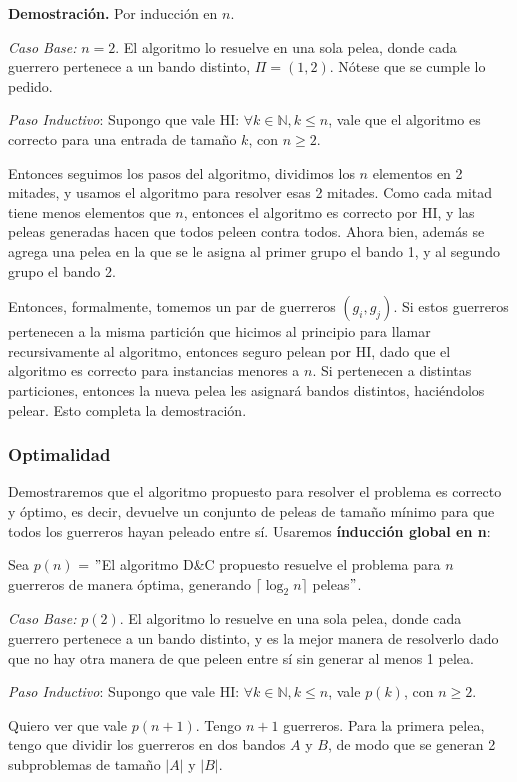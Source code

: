 \textbf{Demostración.}  Por inducción en $n$.

\textit{Caso Base:} $n = 2$. El algoritmo lo resuelve en una sola pelea, donde cada guerrero pertenece a un bando distinto, $\Pi = {(1,2)}$. Nótese que se cumple lo pedido.

\textit{Paso Inductivo}: Supongo que vale HI: $\forall k \in \mathbb{N}, k \leq n$, vale que el algoritmo es correcto para una entrada de tamaño $k$, con $n \geq 2$.

Entonces seguimos los pasos del algoritmo, dividimos los $n$ elementos en 2 mitades, y usamos el algoritmo para resolver esas 2 mitades. Como cada mitad tiene menos elementos que $n$, entonces el algoritmo es correcto por HI, y las peleas generadas hacen que todos peleen contra todos. Ahora bien, además se agrega una pelea en la que se le asigna al primer grupo el bando 1, y al segundo grupo el bando 2.

Entonces, formalmente, tomemos un par de guerreros $(g_i, g_j)$. Si estos guerreros pertenecen a la misma partición que hicimos al principio para llamar recursivamente al algoritmo, entonces seguro pelean por HI, dado que el algoritmo es correcto para instancias menores a $n$. Si pertenecen a distintas particiones, entonces la nueva pelea les asignará bandos distintos, haci\'endolos pelear. Esto completa la demostración.

\subsubsection{Optimalidad}

Demostraremos que el algoritmo propuesto para resolver el problema es correcto y óptimo, es decir, devuelve un conjunto de peleas de tamaño mínimo para que todos los guerreros hayan peleado entre sí. Usaremos \textbf{índucción global en n}:

Sea $p(n)$ = $"$El algoritmo D\&C propuesto resuelve el problema para $n$ guerreros de manera óptima, generando $\lceil \log _2 n \rceil$ peleas$"$. 

\textit{Caso Base:} $p(2)$. El algoritmo lo resuelve en una sola pelea, donde cada guerrero pertenece a un bando distinto, y es la mejor manera de resolverlo dado que no hay otra manera de que peleen entre sí sin generar al menos 1 pelea.

\textit{Paso Inductivo}: Supongo que vale HI: $\forall k \in \mathbb{N}, k \leq n$, vale $p(k)$, con $n \geq 2$.

Quiero ver que vale $p(n+1)$.
Tengo $n+1$ guerreros. Para la primera pelea, tengo que dividir los guerreros en dos bandos $A$ y $B$, de modo que se generan 2 subproblemas de tamaño $|A|$ y $|B|$.

